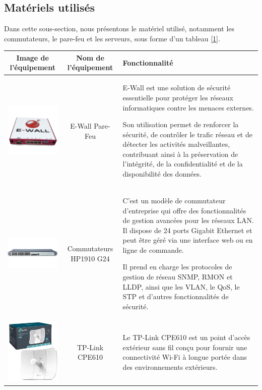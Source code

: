 \subsection{Matériels utilisés}

Dans cette sous-section, nous présentons le matériel utilisé, notamment les commutateurs, le pare-feu et les serveurs, sous forme d'un tableau \ref{1}.


\begin{table}[H]
\begin{center}
\begin{tabular}{|c{3cm}|c{3cm}|l{10cm}|}
\hline
\textbf{Image de l'équipement}         & \textbf{Nom de l'équipement}   & \textbf{Fonctionnalité} \\
\hline
\includegraphics[width=3cm]{Images/ewall.png} & E-Wall Pare-Feu & E-Wall est une solution de sécurité essentielle pour protéger les réseaux informatiques contre les menaces externes. 

Son utilisation permet de renforcer la sécurité, de contrôler le trafic réseau et de détecter les activités malveillantes, contribuant ainsi à la préservation de l'intégrité, de la confidentialité et de la disponibilité des données. \\
\hline
\includegraphics[width=3cm]{Images/HP1910.png} & Commutateurs HP1910 G24 & C'est un modèle de commutateur d'entreprise qui offre des fonctionnalités de gestion avancées pour les réseaux LAN. Il dispose de 24 ports Gigabit Ethernet et peut être géré via une interface web ou en ligne de commande. 

Il prend en charge les protocoles de gestion de réseau SNMP, RMON et LLDP, ainsi que les VLAN, le QoS, le STP et d'autres fonctionnalités de sécurité.  \\
\hline
\includegraphics[width=3cm]{Images/TP-Link-CPE610-5GHz_1.png} & TP-Link CPE610 & Le TP-Link CPE610 est un point d'accès extérieur sans fil conçu pour fournir une connectivité Wi-Fi à longue portée dans des environnements extérieurs. 


\end{tabular}
\end{center}
\end{table}
